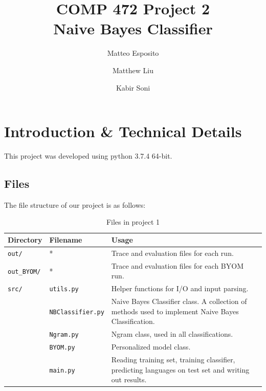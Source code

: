\documentclass[runningheads]{llncs}
\begin{document}
\title{COMP 472 Project 2 \\ Naive Bayes Classifier}

\author{Matteo Esposito \and
Matthew Liu \and
Kabir Soni}



\maketitle

\section{Introduction \& Technical Details}

This project was developed using python 3.7.4 64-bit.

\subsection{Files}

The file structure of our project is as follows:

\begin{table}
    \centering
    \caption{Files in project 1}\label{tab0}
    \begin{tabularx}{\textwidth}{|l|l|X|}
        \hline
        \textbf{Directory} & \textbf{Filename} & \textbf{Usage} \\ \hline
        \verb|out/| & * & Trace and evaluation files for each run. \\ \hline
        \verb|out_BYOM/| & * & Trace and evaluation files for each BYOM run. \\ \hline
        \verb|src/| & \verb|utils.py| & Helper functions for I/O and input parsing. \\ \hline
                    & \verb|NBClassifier.py| & Naive Bayes Classifier class. A collection of methods used to implement Naive Bayes Classification. \\ \hline
                    & \verb|Ngram.py| & Ngram class, used in all classifications. \\ \hline
                    & \verb|BYOM.py| & Personalized model class. \\ \hline
                    & \verb|main.py| & Reading training set, training classifier, predicting languages on test set and writing out results. \\ \hline
    \end{tabularx}
\end{table}
\end{document}

